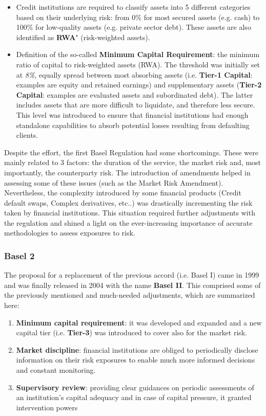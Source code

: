 \documentclass[a4paper,12pt]{article}
\begin{document}
    \begin{itemize}
        \item Credit institutions are required to classify assets into 5 different categories based on their underlying risk: from 0\% for most secured assets (e.g. cash) to 100\% for low-quality assets (e.g. private sector debt). These assets are also identified as \textbf{RWA}" (risk-weighted assets).
        \item Definition of the so-called \textbf{Minimum Capital Requirement}: the minimum ratio of capital to risk-weighted assets (RWA). The threshold was initially set at \textit{8\%}, equally spread between most absorbing assets (i.e. \textbf{Tier-1 Capital}: examples are equity and retained earnings) and supplementary assets (\textbf{Tier-2 Capital}: examples are evaluated assets and subordinated debt). The latter includes assets that are more difficult to liquidate, and therefore less secure. This level was introduced to ensure that financial institutions had enough standalone capabilities to absorb potential losses resulting from defaulting clients.
    \end{itemize}
    
    Despite the effort, the first Basel Regulation had some shortcomings. 
    These were mainly related to 3 factors: 
    the duration of the service, 
    the market risk and, most importantly, 
    the counterparty risk. 
    The introduction of amendments helped in assessing some of these issues
    (such as the Market Risk Amendment). 
    Nevertheless, the complexity introduced by some financial products 
    (Credit default swaps, Complex derivatives, etc..) was drastically incrementing 
    the risk taken by financial institutions. 
    This situation required further adjustments with the regulation and 
    shined a light on the ever-increasing importance of accurate methodologies 
    to assess exposures to risk. 
    
    \subsubsection[]{Basel 2}
    The proposal for a replacement of the previous accord (i.e. Basel I) came in 1999 
    and was finally released in 2004 with the name \textbf{Basel II}.
    This comprised some of the previously mentioned and much-needed adjustments, 
    which are summarized here:

    \begin{enumerate}
        \item \textbf{Minimum capital requirement}: it was developed and expanded and a new capital tier (i.e. \textbf{Tier-3}) was introduced to cover also for the market risk.
        \item \textbf{Market discipline}: financial institutions are obliged to periodically disclose information on their risk exposures to enable much more informed decisions and constant monitoring.
        \item \textbf{Supervisory review}: providing clear guidances on periodic assessments of an institution's capital adequacy and in case of capital pressure, it granted intervention powers
    \end{enumerate}
\end{document}
